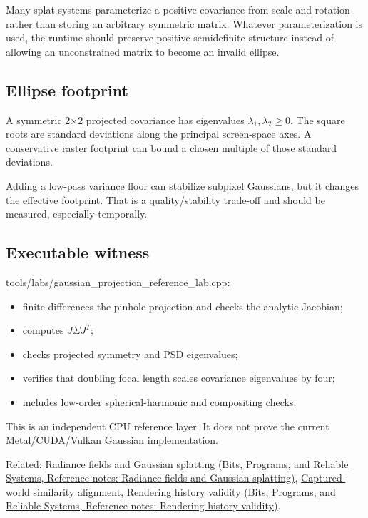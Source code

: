 Many splat systems parameterize a positive covariance from scale and rotation rather than storing an arbitrary symmetric matrix. Whatever parameterization is used, the runtime should preserve positive-semidefinite structure instead of allowing an unconstrained matrix to become an invalid ellipse.

\subsection{Ellipse footprint}\label{appendix-24269cb6977c-ellipse-footprint}

A symmetric 2×2 projected covariance has eigenvalues \(\lambda_1,\lambda_2\ge0\). The square roots are standard deviations along the principal screen-space axes. A conservative raster footprint can bound a chosen multiple of those standard deviations.

Adding a low-pass variance floor can stabilize subpixel Gaussians, but it changes the effective footprint. That is a quality/stability trade-off and should be measured, especially temporally.

\subsection{Executable witness}\label{appendix-24269cb6977c-executable-witness}

tools/labs/gaussian\_projection\_reference\_lab.cpp:

\begin{itemize}
\tightlist
\item
  finite-differences the pinhole projection and checks the analytic Jacobian;
\item
  computes \(J\Sigma J^T\);
\item
  checks projected symmetry and PSD eigenvalues;
\item
  verifies that doubling focal length scales covariance eigenvalues by four;
\item
  includes low-order spherical-harmonic and compositing checks.
\end{itemize}

This is an independent CPU reference layer. It does not prove the current Metal/CUDA/Vulkan Gaussian implementation.

Related: \href{../01-Bits-Programs-and-Reliable-Systems/main.pdf\#nameddest=appendix-c5b332e400e7}{Radiance fields and Gaussian splatting (Bits, Programs, and Reliable Systems, Reference notes: Radiance fields and Gaussian splatting)}, \hyperref[appendix-5f40b4fea463]{Captured-world similarity alignment}, \href{../01-Bits-Programs-and-Reliable-Systems/main.pdf\#nameddest=appendix-2e7e9fd28a2c}{Rendering history validity (Bits, Programs, and Reliable Systems, Reference notes: Rendering history validity)}.

